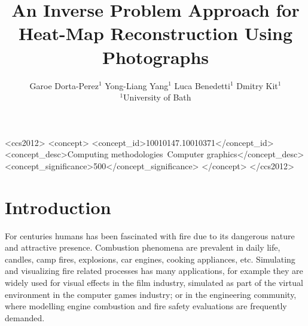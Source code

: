 \documentclass{acmsiggraph}
\title{An Inverse Problem Approach for Heat-Map Reconstruction Using Photographs}
\author{Garoe Dorta-Perez$^1$ \qquad Yong-Liang Yang$^1$ \qquad Luca Benedetti$^1$ \qquad Dmitry Kit$^1$ \\$^1$University of Bath}
\begin{document}


\maketitle

\begin{abstract}



\end{abstract}

%
%
\begin{CCSXML}
<ccs2012>
<concept>
<concept_id>10010147.10010371</concept_id>
<concept_desc>Computing methodologies~Computer graphics</concept_desc>
<concept_significance>500</concept_significance>
</concept>
</ccs2012>
\end{CCSXML}


%
%


\keywordlist

\conceptlist

\printcopyright

\section{Introduction}

For centuries humans has been fascinated with fire due to its dangerous nature and attractive presence.
Combustion phenomena are prevalent in daily life, candles, camp fires, explosions, car engines, cooking appliances, etc.
Simulating and visualizing fire related processes has many applications, for example they are widely used for visual effects in the film industry, simulated as part of the virtual environment in the computer games industry; or in the engineering community, where modelling engine combustion and fire safety evaluations are frequently demanded.
\end{document}

